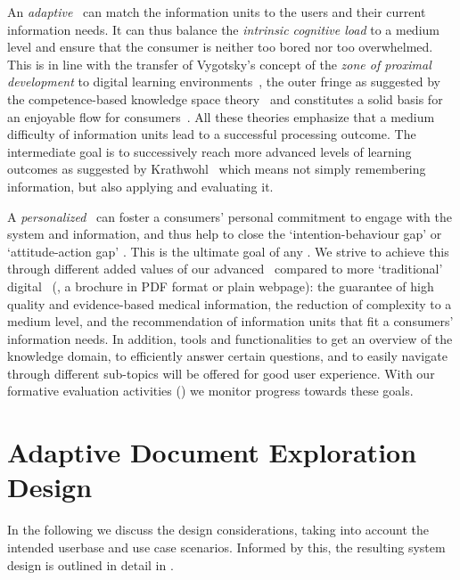 An \emph{adaptive} \chis\ can match the information units to the users and their current information needs. 
%
It can thus balance the \emph{intrinsic cognitive load} to a medium level and ensure that the consumer is neither too bored nor too overwhelmed. 
%
This is in line with the transfer of Vygotsky’s concept of the \emph{zone of proximal development} to digital learning environments~\cite{luckin2010re}, the outer fringe as suggested by the competence-based knowledge space theory~\cite{heller2006competence} and constitutes a solid basis for an enjoyable flow for consumers~\cite{schiefele2011skills}. 
%
All these theories emphasize that a medium difficulty of information units lead to a successful processing outcome. The intermediate goal is to successively reach more advanced levels of learning outcomes as suggested by Krathwohl~\cite{krathwohl2002revision} which means not simply remembering information, but also applying and evaluating it.


A \emph{personalized} \chis\ can foster a consumers’ personal commitment to engage with the system and information, and thus help to close the `intention-behaviour gap’ or `attitude-action gap' \cite{schwarzer2008modeling}. 
%
This is the ultimate goal of any \chis. 
%
We strive to achieve this through different added values of our advanced \chis\ compared to more `traditional’ digital \chis\ (\eg, a brochure in PDF format or plain webpage): the guarantee of high quality and evidence-based medical information, the reduction of complexity to a medium level, and the recommendation of information units that fit a consumers’ information needs. 
%
In addition, tools and functionalities to get an overview of the knowledge domain, to efficiently answer certain questions, and to easily navigate through different sub-topics will be offered for good user experience. With our formative evaluation activities () we monitor progress towards these goals.






\section{Adaptive Document Exploration Design} \label{sec:proposed-design}
%
In the following  we discuss the design considerations, taking into account the intended userbase and use case scenarios. 
%
Informed by this, the resulting system design is outlined in detail in .


